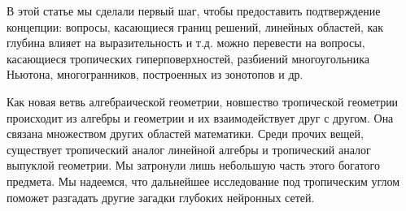 \documentclass[russian]{lecture-notes}
\begin{document}
	В этой статье мы сделали первый шаг, чтобы предоставить подтверждение концепции: вопросы, касающиеся границ решений, линейных областей, как глубина влияет на выразительность и т.д. можно перевести на вопросы, касающиеся тропических гиперповерхностей, разбиений многоугольника Ньютона, многогранников, построенных из зонотопов и др.
	
	Как новая ветвь алгебраической геометрии, новшество тропической геометрии происходит из алгебры и геометрии и их взаимодействует друг с другом. Она связана множеством других областей математики. Среди прочих вещей, существует тропический аналог линейной алгебры и тропический аналог выпуклой геометрии. Мы затронули лишь небольшую часть этого богатого предмета. Мы надеемся, что дальнейшее исследование под тропическим углом поможет разгадать другие загадки глубоких нейронных сетей.
	
\end{document}
